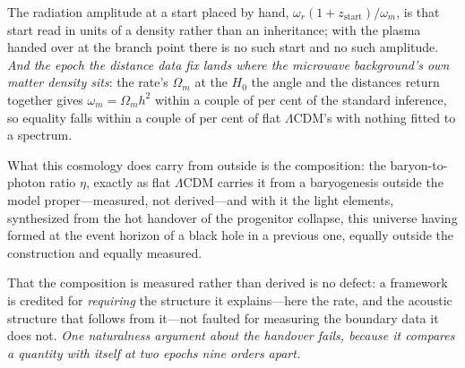 \documentclass[11pt,a4paper]{article}
\theoremstyle{plain}
\theoremstyle{definition}
\theoremstyle{remark}
\begin{document}
The radiation amplitude at a start placed by hand, $\omega_r(1+z_{\mathrm{start}})/\omega_m$, is that start read in units of a density rather than an inheritance; with the plasma handed over at the branch point there is no such start and no such amplitude. \emph{And the epoch the distance data fix lands where the microwave background's own matter density sits}: the rate's $\Omega_m$ at the $H_0$ the angle and the distances return together gives $\omega_m=\Omega_m h^{2}$ within a couple of per cent of the standard inference, so equality falls within a couple of per cent of flat $\Lambda$CDM's with nothing fitted to a spectrum. 

What this cosmology does carry from outside is the composition: the baryon-to-photon ratio $\eta$, exactly as flat $\Lambda$CDM carries it from a baryogenesis outside the model proper---measured, not derived---and with it the light elements, synthesized from the hot handover of the progenitor collapse, this universe having formed at the event horizon of a black hole in a previous one, equally outside the construction and equally measured. 

That the composition is measured rather than derived is no defect: a framework is credited for \emph{requiring} the structure it explains---here the rate, and the acoustic structure that follows from it---not faulted for measuring the boundary data it does not. \emph{One naturalness argument about the handover fails, because it compares a quantity with itself at two epochs nine orders apart.} 
\end{document}
